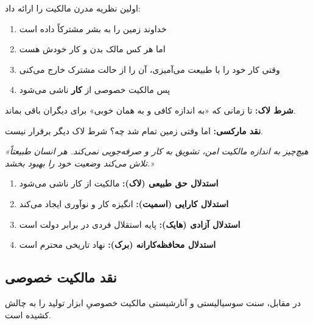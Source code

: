 \begin{personbox}

 اولین نظریه مدرن مالکیت را ارائه داد:

\begin{enumerate}[nosep]
    \item خداوند زمین را به بشر مشترکاً داده است
    \item اما هر کس مالک بدن و کار خودش هست
    \item وقتی کار خود را با طبیعت می‌آمیزی، آن را از حالت مشترک خارج می‌کنی
    \item پس مالکیت خصوصی از \textbf{کار} ناشی می‌شود
\end{enumerate}

\textbf{شرط لاک:} تا زمانی که «به اندازه کافی و به همان خوبی» برای دیگران باقی بماند.

\mediumspace

\textbf{نقد مارکسی:} اما وقتی زمین تمام شد چه؟ شرط لاک دیگر برقرار نیست.
\end{personbox}

\begin{quotebox}
\textit{«هیچ‌چیز به اندازه مالکیت امن، تشویق به کار و صرفه‌جویی نمی‌کند. هر انسان طبیعتاً تلاش می‌کند وضعیت خود را بهبود بخشد.»}
\end{quotebox}

\begin{defbox}
\begin{enumerate}[nosep]
    \item \textbf{استدلال حق طبیعی (لاک):} مالکیت از کار ناشی می‌شود
    \item \textbf{استدلال کارایی (اسمیت):} انگیزه کار و نوآوری ایجاد می‌کند
    \item \textbf{استدلال آزادی (هایک):} پایه استقلال فردی در برابر دولت است
    \item \textbf{استدلال محافظه‌کارانه (برک):} نهاد تاریخی محترم است
\end{enumerate}
\end{defbox}

\subsection{نقد مالکیت خصوصی}

در مقابل، سنت سوسیالیستی و آنارشیستی مالکیت خصوصیِ ابزار تولید را به چالش کشیده است.

